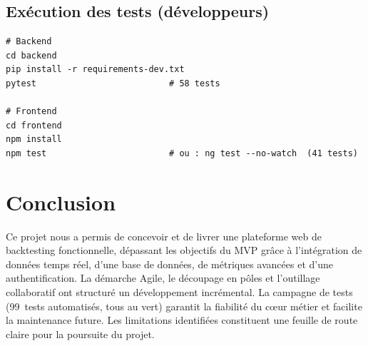 \documentclass[11pt,a4paper]{article}
\begin{document}
\subsection{Exécution des tests (développeurs)}
\begin{lstlisting}[style=sh]
# Backend
cd backend
pip install -r requirements-dev.txt
pytest                          # 58 tests

# Frontend
cd frontend
npm install
npm test                        # ou : ng test --no-watch  (41 tests)
\end{lstlisting}

\section{Conclusion}
Ce projet nous a permis de concevoir et de livrer une plateforme web de
backtesting fonctionnelle, dépassant les objectifs du MVP grâce à l'intégration de
données temps réel, d'une base de données, de métriques avancées et d'une
authentification. La démarche Agile, le découpage en pôles et l'outillage
collaboratif ont structuré un développement incrémental. La campagne de tests
(99~tests automatisés, tous au vert) garantit la fiabilité du c\oe{}ur
métier et facilite la maintenance future. Les limitations identifiées constituent
une feuille de route claire pour la poursuite du projet.

\end{document}

